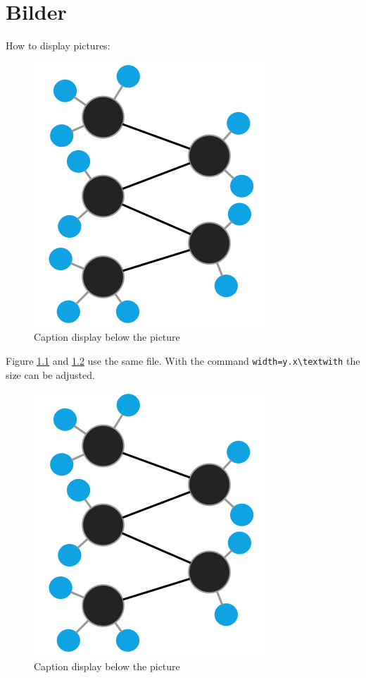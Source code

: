 \chapter{Bilder}
How to display pictures:

\begin{figure}[H] %
  \centering %
  \includegraphics[width=.25\textwidth]{graphics/molecule}
  \caption[Caption for the list of figures]{Caption display below the picture}
  \label{fig:pic1} %
\end{figure}
\noindent
Figure \ref{fig:pic1} and \ref{fig:pic2} use the same file. With the command \verb+width=y.x\textwith+ the size can be adjusted.
\begin{figure}[H] %
  \centering %
  \includegraphics[width=.5\textwidth]{graphics/molecule}
  \caption[Caption for the list of figures]{Caption display below the picture}
  \label{fig:pic2} %
\end{figure}
\noindent
